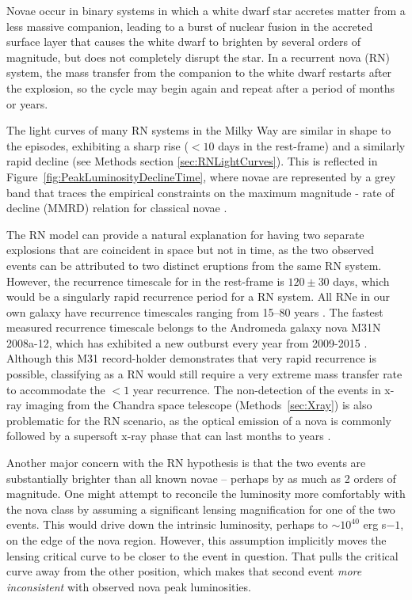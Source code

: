 Novae occur in binary systems in which a white dwarf star accretes
matter from a less massive companion, leading to a burst of nuclear
fusion in the accreted surface layer that causes the white dwarf to
brighten by several orders of magnitude, but does not completely
disrupt the star. In a recurrent nova (RN) system, the mass transfer
from the companion to the white dwarf restarts after the explosion, so
the cycle may begin again and repeat after a period of months or
years.

The light curves of many RN systems in the Milky Way are similar in
shape to the \spock episodes, exhibiting a sharp rise ($<10$ days in
the rest-frame) and a similarly rapid decline (see Methods section
\ref{sec:RNLightCurves}).  This is reflected in
Figure~\ref{fig:PeakLuminosityDeclineTime}, where novae are
represented by a grey band that traces the empirical constraints on
the maximum magnitude - rate of decline (MMRD) relation for classical
novae \citep{DellaValle:1995, Downes:2000, Shafter:2011,
  Kasliwal:2011a}.

The RN model can provide a natural explanation for having two separate
explosions that are coincident in space but not in time, as the two
observed \spock events can be attributed to two distinct eruptions
from the same RN system.  However, the recurrence timescale for \spock
in the rest-frame is $120\pm30$ days, which would be a singularly
rapid recurrence period for a RN system.  All RNe in our own galaxy
have recurrence timescales ranging from 15--80 years
\citep{Schaefer:2010}.  The fastest measured recurrence timescale
belongs to the Andromeda galaxy nova M31N 2008a-12, which has
exhibited a new outburst every year from 2009-2015
\citep{Tang:2014,Darnley:2014,Darnley:2015,Henze:2015,Henze:2015a}. Although
this M31 record-holder demonstrates that very rapid recurrence is
possible, classifying \spock as a RN would still require a very
extreme mass transfer rate to accommodate the $<1$ year recurrence.
The non-detection of the \spock events in x-ray imaging from the
Chandra space telescope (Methods~\ref{sec:Xray}) is also problematic
for the RN scenario, as the optical emission of a nova is commonly
followed by a supersoft x-ray phase that can last months to years
\citep[e.g.]{Hachisu:2006}.

Another major concern with the RN hypothesis is that the
two \spock events are substantially brighter than all known novae --
perhaps by as much as 2 orders of magnitude.  One might attempt to
reconcile the \spock luminosity more comfortably with the nova class
by assuming a significant lensing magnification for one of the two
events. This would drive down the intrinsic luminosity, perhaps to
$\sim10^{40}$ erg s${-1}$, on the edge of the nova region.  However,
this assumption implicitly moves the lensing critical curve to be
closer to the \spock event in question.  That pulls the critical curve
away from the other \spock position, which makes that second event
{\it more inconsistent} with observed nova peak luminosities.  

